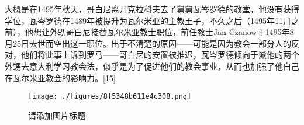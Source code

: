 大概是在1495年秋天，哥白尼离开克拉科夫去了舅舅瓦岑罗德的教堂，他没有获得学位，瓦岑罗德在1489年被提升为瓦尔米亚的主教王子，不久之后（1495年11月之前），他想让外甥哥白尼接替瓦尔米亚教士职位，前任教士Jan Czanow于1495年8月25日去世而空出这一职位。出于不清楚的原因——可能是因为教会一部分人的反对，他们将此事上诉到罗马——哥白尼的安置被推迟，瓦岑罗德倾向于派他的两个外甥去意大利学习教会法，似乎是为了促进他们的教会事业，从而也加强了他自己在瓦尔米亚教会的影响力。[15]
\begin{figure}[ht]
\centering
\texttt{[image: ./figures/8f5348b611e4c308.png]}
\caption{请添加图片标题} \label{fig_GBN_5}
\end{figure}
